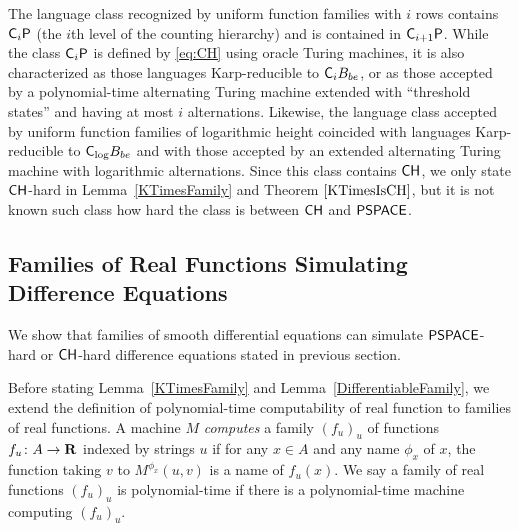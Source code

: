 The language class recognized by uniform function families with $i$ rows
contains $\mathsf{C}_i \mathsf{P}$ (the $i$th level of the counting hierarchy)
and is contained in $\mathsf{C}_{i+1} \mathsf{P}$.
While the class $\mathsf{C}_i \mathsf{P}$ is defined by \eqref{eq:CH} using oracle Turing machines,
it is also characterized as those languages Karp-reducible to $\mathsf{C}_i B_{be}$, or 
as those accepted by a polynomial-time alternating Turing machine 
extended with ``threshold states'' and having at most $i$ alternations.
Likewise, 
the language class accepted by uniform function families of logarithmic height
coincided with languages Karp-reducible to $\mathsf{C}_{\log} B_{be}$
and with those accepted by an extended alternating Turing machine with logarithmic alternations.
Since this class contains $\mathsf{CH}$,
we only state $\mathsf{CH}$-hard in Lemma~\ref{KTimesFamily} and Theorem $\ref{KTimesIsCH}$,
but it is not known such class how hard the class is between $\mathsf{CH}$ and $\mathsf{PSPACE}$.



\subsection{Families of Real Functions Simulating Difference Equations}
\label{subsection: ode family}
We show that families of smooth differential equations can simulate 
$\mathsf{PSPACE}$-hard or $\mathsf{CH}$-hard difference equations stated in previous section.

Before stating Lemma~\ref{KTimesFamily} and Lemma~\ref{DifferentiableFamily},
we extend the definition of polynomial-time computability of real function
to families of real functions.
A machine $M$ \emph{computes} a family $(f_u)_u$ of functions $f _u \colon A \to \mathbf R$ 
indexed by strings $u$
if for any $x \in A$ and any name $\phi_x$ of $x$,
the function taking $v$ to $M ^{\phi _x} (u, v)$ is a name of $f _u (x)$.
We say a family of real functions $(f_u)_u$ is polynomial-time if there is
a polynomial-time machine computing $(f_u)_u$.

